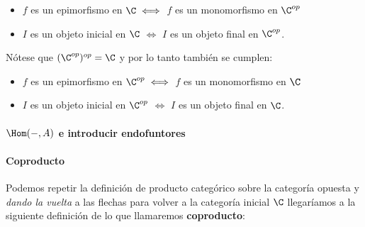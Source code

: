 \begin{itemize}
\item $f$ es un epimorfismo en $\C \iff$ $f$
      es un monomorfismo en $\C^{op}$
\item $I$ es un objeto inicial en $\C$ $\iff$ $I$
      es un objeto final en $\C^{op}$.
\end{itemize}

Nótese que $(\C^{op})^{op}=\C$ y por lo tanto también se
cumplen:
\begin{itemize}
\item $f$ es un epimorfismo en $\C^{op} \iff$ $f$
      es un monomorfismo en $\C$
\item $I$ es un objeto inicial en $\C^{op}$ $\iff$ $I$
      es un objeto final en $\C$.
\end{itemize}

\paragraph{$\Hom(-, A)$ e introducir endofuntores}

\paragraph{Coproducto}
Podemos repetir la definición de producto categórico sobre la categoría
opuesta y \textit{dando la vuelta} a las flechas para volver a la
categoría inicial $\C$ llegaríamos a la siguiente definición de lo que
llamaremos \textbf{coproducto}:

